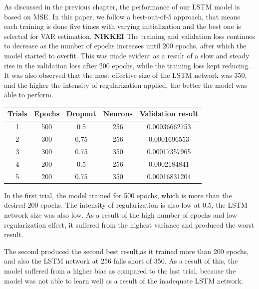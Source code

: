 \documentclass[a4paper,11pt,oneside]{book}
\begin{document}
As discussed in the previous chapter, the performance of our LSTM model is based on MSE. In this paper, we follow a best-out-of-5 approach, that means each training is done five times with varying initialization and the best one is selected for VAR estimation.\newline\newline
\textbf{NIKKEI}\newline\newline
The training and validation loss continues to decrease as the number of epochs increases until 200 epochs,
after which the model started to overfit. This was made evident as a result of a slow and steady rise in the
validation loss after 200 epochs, while the training loss kept reducing.
It was also observed that the most effective size of the LSTM network was 350, and the higher the intensity
of regularization applied, the better the model was able to perform.

\begin{center}
	\begin{tabular}{||c c c c c||} 
		\hline
		Trials & Epochs & Dropout & Neurons & Validation result\\ [0.5ex] 
		\hline\hline
		1 & 500 & 0.5 & 256 & 0.00036662753 \\ 
		\hline
		2 & 300 & 0.75 & 256 & 0.0001696553 \\
		\hline
		3 & 300 & 0.75 & 350 & 0.00017357965 \\
		\hline
		4 & 200 & 0.5 & 256 & 0.0002184841 \\
		\hline
		5 & 200 & 0.75 & 350 & 0.00016831204\\ [1ex] 
		\hline
	\end{tabular}
\end{center}

In the first trial, the model trained for 500 epochs, which is more than the desired 200 epochs. The intensity of
regularization is also low at 0.5, the LSTM network size was also low. As a result of the high number of
epochs and low regularization effect, it suffered from the highest variance and produced the worst result.\newline

The second produced the second best result,as it trained more than 200 epochs, and
also the LSTM network at 256 falls short of 350. As a result of this, the model suffered from a higher bias as
compared to the last trial, because the model was not able to learn well as a result of the inadequate LSTM network.\newline
\end{document}
